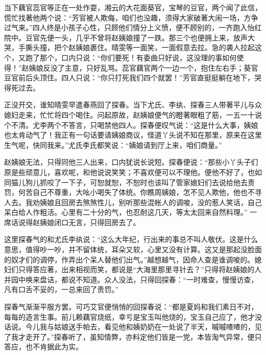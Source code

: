 \begin{parag}


    当下藕官蕊官等正在一处作耍，湘云的大花面葵官，宝琴的豆官，两个闻了此信，慌忙找著他两个说：“芳官被人欺侮，咱们也没趣，须得大家破著大闹一场，方争过气来。”四人终是小孩子心性，只顾他们情分上义愤，便不顾别的，一齐跑入怡红院中。豆官先便一头，几乎不曾将赵姨娘撞了一跌。那三个也便拥上来，放声大哭，手撕头撞，把个赵姨娘裹住。晴雯等一面笑，一面假意去拉。急的袭人拉起这个，又跑了那个，口内只说：“你们要死！有委曲只好说，这没理的事如何使得！”赵姨娘反没了主意，只好乱骂。蕊官藕官两个一边一个，抱住左右手；葵官豆官前后头顶住。四人只说：“你只打死我们四个就罢！”芳官直挺挺躺在地下，哭得死过去。
\end{parag}


\begin{parag}


    正没开交，谁知晴雯早遣春燕回了探春。当下尤氏、李纨、探春三人带著平儿与众媳妇走来，忙忙将四个喝住。问起原故，赵姨娘便气的瞪著眼粗了筋，一五一十说个不清。尤李两个不答言，只喝禁他四人。探春便叹气说：“这是什么大事，姨娘也太肯动气了！我正有一句话要请姨娘商议，怪道丫头说不知在那里，原来在这里生气呢，快同我来。”尤氏李氏都笑说：“姨娘请到厅上来，咱们商量。”
\end{parag}


\begin{parag}


    赵姨娘无法，只得同他三人出来，口内犹说长说短。探春便说：“那些小丫头子们原是些顽意儿，喜欢呢，和他说说笑笑；不喜欢便可以不理他。便他不好了，也如同猫儿狗儿抓咬了一下子，可恕就恕，不恕时也该叫了管家媳妇们去说给他去责罚，何苦自己不尊重，大吆小喝失了体统。你瞧周姨娘，怎不见人欺他，他也不寻人去。我劝姨娘且回房去煞煞性儿，别听那些混帐人的调唆，没的惹人笑话，自己呆白给人作粗活。心里有二十分的气，也忍耐这几天，等太太回来自然料理。” 一席话说得赵姨娘闭口无言，只得回房去了。
\end{parag}


\begin{parag}


    这里探春气的和尤氏李纨说：“这么大年纪，行出来的事总不叫人敬伏。这是什么意思，值得吵一吵，并不留体统，耳朵又软，心里又没有计算。这又是那起没脸面的奴才们的调停，作弄出个呆人替他们出气。”越想越气，因命人查是谁调唆的。媳妇们只得答应著，出来相视而笑，都说是“大海里那里寻针去？”只得将赵姨娘的人并园中唤来盘诘，都说不知道。众人没法，只得回探春：“一时难查，慢慢访查，凡有口舌不妥的，一总来回了责罚。”
\end{parag}


\begin{parag}


    探春气渐渐平服方罢。可巧艾官便悄悄的回探春说：“都是夏妈和我们素日不对，每每的造言生事。前儿赖藕官烧纸，幸亏是宝玉叫他烧的，宝玉自己应了，他才没话说。今儿我与姑娘送手帕去，看见他和姨奶奶在一处说了半天，嘁嘁喳喳的，见了我才走开了。”探春听了，虽知情弊，亦料定他们皆是一党，本皆淘气异常，便只答应，也不肯据此为实。
\end{parag}


